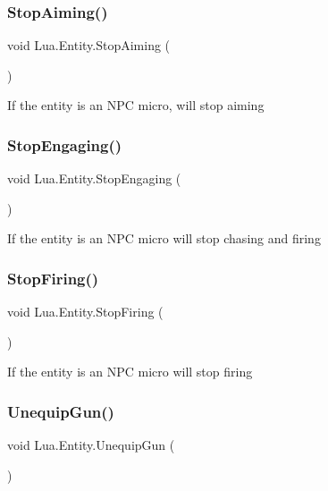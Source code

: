 \subsubsection{\texorpdfstring{StopAiming()}{StopAiming()}}
{\footnotesize\ttfamily void Lua.\+Entity.\+Stop\+Aiming (\begin{DoxyParamCaption}{ }\end{DoxyParamCaption})}



If the entity is an N\+PC micro, will stop aiming 

\mbox{\label{class_lua_1_1_entity_a9ead5c7d5e821fa285ab065b9cc3185f}} 
\subsubsection{\texorpdfstring{StopEngaging()}{StopEngaging()}}
{\footnotesize\ttfamily void Lua.\+Entity.\+Stop\+Engaging (\begin{DoxyParamCaption}{ }\end{DoxyParamCaption})}



If the entity is an N\+PC micro will stop chasing and firing 

\mbox{\label{class_lua_1_1_entity_a4d7809fc03b618624a6d7640674fe646}} 
\subsubsection{\texorpdfstring{StopFiring()}{StopFiring()}}
{\footnotesize\ttfamily void Lua.\+Entity.\+Stop\+Firing (\begin{DoxyParamCaption}{ }\end{DoxyParamCaption})}



If the entity is an N\+PC micro will stop firing 

\mbox{\label{class_lua_1_1_entity_a1a4cc3d2425ef3527ab0692f4c2a9ca3}} 
\subsubsection{\texorpdfstring{UnequipGun()}{UnequipGun()}}
{\footnotesize\ttfamily void Lua.\+Entity.\+Unequip\+Gun (\begin{DoxyParamCaption}{ }\end{DoxyParamCaption})}



